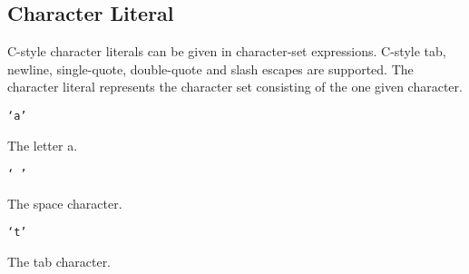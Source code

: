 
\subsection{Character Literal}
{
	C-style character literals can be given in character-set expressions.
	C-style tab, newline, single-quote, double-quote and slash escapes are
	supported.
	The character literal represents the character set consisting of
	the one given character.
	
	\begin{itemize}
	{
		\item \texttt{`a'}
		
			The letter a.
		
		\item \texttt{` '}
		
			The space character.
		
		\item \texttt{`t'}
		
			The tab character.
	}
	\end{itemize}
}
